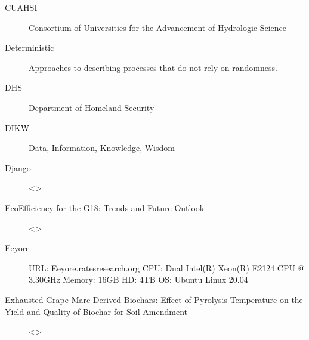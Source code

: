 \documentclass[letterpaper,12pt,english]{book}
\begin{document}
\begin{description}
\item[{CUAHSI\label{\detokenize{glossary:term-CUAHSI}}}] \leavevmode
\sphinxAtStartPar
Consortium of Universities for the Advancement of Hydrologic Science

\item[{Deterministic\label{\detokenize{glossary:term-Deterministic}}}] \leavevmode
\sphinxAtStartPar
Approaches to describing processes that do not rely on randomness.

\item[{DHS\label{\detokenize{glossary:term-DHS}}}] \leavevmode
\sphinxAtStartPar
Department of Homeland Security

\item[{DIKW\label{\detokenize{glossary:term-DIKW}}}] \leavevmode
\sphinxAtStartPar
Data, Information, Knowledge, Wisdom

\item[{Django\label{\detokenize{glossary:term-Django}}}] \leavevmode
\sphinxAtStartPar
\textless{}\textgreater{}

\item[{Eco\sphinxhyphen{}Efficiency for the G18: Trends and Future Outlook\label{\detokenize{glossary:term-Eco-Efficiency-for-the-G18-Trends-and-Future-Outlook}}}] \leavevmode
\sphinxAtStartPar
\textless{}\textgreater{}

\item[{Eeyore\label{\detokenize{glossary:term-Eeyore}}}] \leavevmode
\sphinxAtStartPar
URL: Eeyore.ratesresearch.org CPU: Dual Intel(R) Xeon(R) E\sphinxhyphen{}2124 CPU @ 3.30GHz Memory: 16GB HD: 4TB OS: Ubuntu Linux 20.04

\item[{Exhausted Grape Marc Derived Biochars: Effect of Pyrolysis Temperature on the Yield and Quality of Biochar for Soil Amendment\label{\detokenize{glossary:term-Exhausted-Grape-Marc-Derived-Biochars-Effect-of-Pyrolysis-Temperature-on-the-Yield-and-Quality-of-Biochar-for-Soil-Amendment}}}] \leavevmode
\sphinxAtStartPar
\textless{}\textgreater{}


\end{description}
\end{document}
